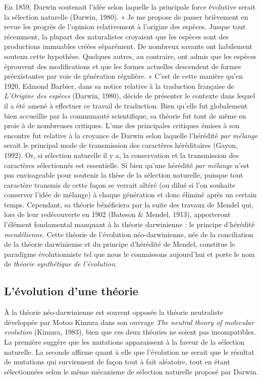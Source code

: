 \documentclass[12pt,a4paper,twoside]{ugathesis}
\theoremstyle{definition}
\theoremstyle{definition}
\theoremstyle{remark}
\begin{document}
En 1859, Darwin soutenait l'idée selon laquelle la principale force
évolutive serait la sélection naturelle (Darwin, 1980). « Je me propose
de passer brièvement en revue les progrès de l'opinion relativement à
l'origine des espèces. Jusque tout récemment, la plupart des
naturalistes croyaient que les espèces sont des productions immuables
créées séparément. De nombreux savants ont habilement soutenu cette
hypothèse. Quelques autres, au contraire, ont admis que les espèces
éprouvent des modifications et que les formes actuelles descendent de
formes préexistantes par voie de génération régulière. » C'est de cette
manière qu'en 1920, Edmond Barbier, dans sa notice relative à la
traduction française de \emph{L'Origine des espèces} (Darwin, 1980),
décide de présenter le contexte dans lequel il a été amené à effectuer
ce travail de traduction. Bien qu'elle fut globalement bien accueillie
par la communauté scientifique, sa théorie fut tout de même en proie à
de nombreuses critiques. L'une des principales critiques émises à son
encontre fut relative à la croyance de Darwin selon laquelle l'hérédité
\emph{par mélange} serait le principal mode de transmission des
caractères héréditaires (Gayon, 1992). Or, si sélection naturelle il y
a, la conservation et la transmission des caractères sélectionnés est
essentielle. Si bien qu'une hérédité \emph{par mélange} n'est pas
envisageable pour soutenir la thèse de la sélection naturelle, puisque
tout caractère transmis de cette façon se verrait altéré (ou dilué si
l'on souhaite conserver l'idée de mélange) à chaque génération et donc
éliminé après un certain temps. Cependant, sa théorie bénéficiera par la
suite des travaux de Mendel qui, lors de leur redécouverte en 1902
(Bateson \& Mendel, 1913), apporteront l'élément fondamental manquant à
la théorie darwinienne : le principe d'hérédité \emph{mendélienne}.
Cette théorie de l'évolution néo-darwinienne, née de la conciliation de
la théorie darwinienne et du principe d'hérédité de Mendel, constitue le
paradigme évolutionniste tel que nous le connaissons aujourd'hui et
porte le nom de \emph{théorie synthétique de l'évolution}.

\subsection{L'évolution d'une théorie}\label{levolution-dune-theorie}

À la théorie néo-darwinienne est souvent opposée la théorie neutraliste
développée par Motoo Kimura dans son ouvrage \emph{The neutral theory of
molecular evolution} (Kimura, 1983), bien que ces deux théories ne
soient pas incompatibles. La première suggère que les mutations
apparaissent à la faveur de la sélection naturelle. La seconde affirme
quant à elle que l'évolution ne serait que le résultat de mutations qui
surviennent de façon tout à fait aléatoire, tout en étant sélectionnées
selon le même mécanisme de sélection naturelle proposé par Darwin.
\end{document}
